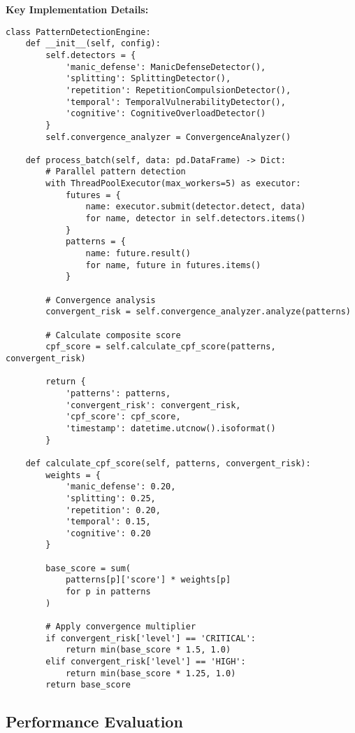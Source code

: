 \documentclass[11pt,a4paper]{article}
\begin{document}
\textbf{Key Implementation Details:}

\begin{lstlisting}[caption={Core Pattern Detection Engine},label={lst:engine}]
class PatternDetectionEngine:
    def __init__(self, config):
        self.detectors = {
            'manic_defense': ManicDefenseDetector(),
            'splitting': SplittingDetector(),
            'repetition': RepetitionCompulsionDetector(),
            'temporal': TemporalVulnerabilityDetector(),
            'cognitive': CognitiveOverloadDetector()
        }
        self.convergence_analyzer = ConvergenceAnalyzer()
        
    def process_batch(self, data: pd.DataFrame) -> Dict:
        # Parallel pattern detection
        with ThreadPoolExecutor(max_workers=5) as executor:
            futures = {
                name: executor.submit(detector.detect, data)
                for name, detector in self.detectors.items()
            }
            patterns = {
                name: future.result()
                for name, future in futures.items()
            }
        
        # Convergence analysis
        convergent_risk = self.convergence_analyzer.analyze(patterns)
        
        # Calculate composite score
        cpf_score = self.calculate_cpf_score(patterns, convergent_risk)
        
        return {
            'patterns': patterns,
            'convergent_risk': convergent_risk,
            'cpf_score': cpf_score,
            'timestamp': datetime.utcnow().isoformat()
        }
    
    def calculate_cpf_score(self, patterns, convergent_risk):
        weights = {
            'manic_defense': 0.20,
            'splitting': 0.25,
            'repetition': 0.20,
            'temporal': 0.15,
            'cognitive': 0.20
        }
        
        base_score = sum(
            patterns[p]['score'] * weights[p] 
            for p in patterns
        )
        
        # Apply convergence multiplier
        if convergent_risk['level'] == 'CRITICAL':
            return min(base_score * 1.5, 1.0)
        elif convergent_risk['level'] == 'HIGH':
            return min(base_score * 1.25, 1.0)
        return base_score
\end{lstlisting}

\subsection{Performance Evaluation}
\end{document}

